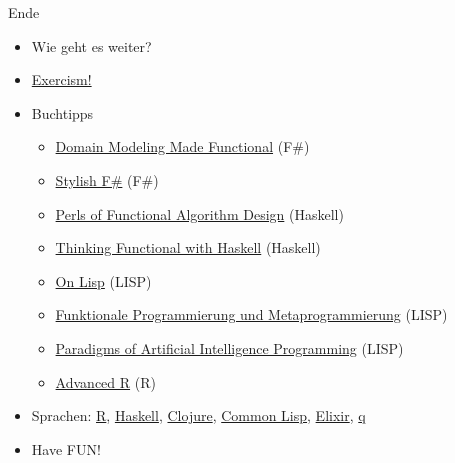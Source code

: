 \documentclass[t]{beamer}
\begin{document}
\begin{frame}[label={sec:orgfaba227}]{Ende}
\begin{itemize}
\item Wie geht es weiter?
\item \href{https://exercism.io}{Exercism!}
\item Buchtipps
\begin{itemize}
\item \href{https://pragprog.com/book/swdddf/domain-modeling-made-functional}{Domain Modeling Made Functional} (F\#)
\item \href{https://www.apress.com/gp/book/9781484239995}{Stylish F\#} (F\#)
\item \href{https://www.cambridge.org/core/books/pearls-of-functional-algorithm-design/B0CF0AC5A205AF9491298684113B088F\#}{Perls of Functional Algorithm Design} (Haskell)
\item \href{https://www.cs.ox.ac.uk/publications/books/functional/}{Thinking Functional with Haskell} (Haskell)
\item \href{http://www.paulgraham.com/onlisp.html}{On Lisp} (LISP)
\item \href{http://www.iqool.de/FPMP.html}{Funktionale Programmierung und Metaprogrammierung} (LISP)
\item \href{https://github.com/norvig/paip-lisp}{Paradigms of Artificial Intelligence Programming} (LISP)
\item \href{https://adv-r.hadley.nz/}{Advanced R} (R)
\end{itemize}
\item Sprachen: \href{https://www.r-project.org/}{R}, \href{https://www.haskell.org/}{Haskell}, \href{https://clojure.org/}{Clojure}, \href{https://lisp-lang.org/}{Common Lisp}, \href{https://elixir-lang.org/}{Elixir}, \href{https://code.kx.com/q/}{q}

\item \alert{\alert{Have FUN!}}
\end{itemize}
\end{frame}
\end{document}
